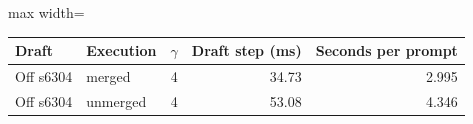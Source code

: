 \scriptsize
\setlength{\tabcolsep}{3.5pt}
\label{tab:t3unmerged}
\begin{adjustbox}{max width=\linewidth}
\begin{tabular}{llrrr}
\toprule
Draft & Execution & $\gamma$ & Draft step (ms) & Seconds per prompt \\
\midrule
Off s6304 & merged & 4 & 34.73 & 2.995 \\
Off s6304 & unmerged & 4 & 53.08 & 4.346 \\
\bottomrule
\end{tabular}
\end{adjustbox}
